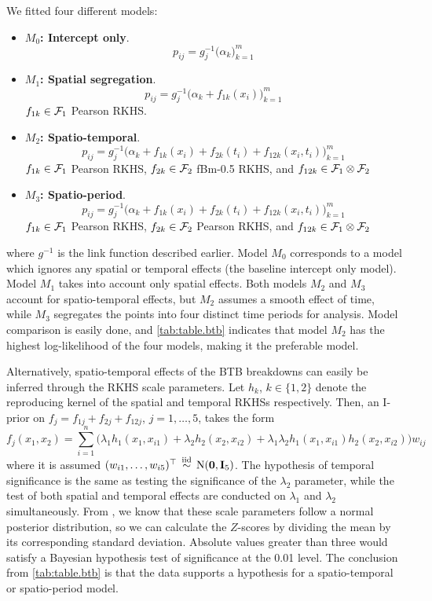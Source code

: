 \documentclass[a4paper,showframe,11pt]{report}\usepackage[]{graphicx}\usepackage[]{color}
\begin{document}
We fitted four different models:
\begin{itemize}
  \item \textbf{\boldmath$M_0$: Intercept only}.
  \[
    p_{ij} = g^{-1}_j\big( \alpha_k \big)_{k=1}^m
  \]
  \item \textbf{\boldmath$M_1$: Spatial segregation}.
  \[
    p_{ij} = g^{-1}_j\big(\alpha_k + f_{1k}(x_i) \big)_{k=1}^m
  \]
  $f_{1k} \in {\mathcal F}_1$ Pearson RKHS.
  \item \textbf{\boldmath$M_2$: Spatio-temporal}.
  \[
    p_{ij} = g^{-1}_j\big(\alpha_k + f_{1k}(x_i) + f_{2k}(t_i) + f_{12k}(x_i,t_i) \big)_{k=1}^m
  \]
  $f_{1k} \in {\mathcal F}_1$ Pearson RKHS, $f_{2k} \in {\mathcal F}_2$ fBm-0.5 RKHS, and $f_{12k} \in {\mathcal F}_1\otimes{\mathcal F}_2$
  \item \textbf{\boldmath$M_3$: Spatio-period}.
  \[
    p_{ij} = g^{-1}_j\big(\alpha_k + f_{1k}(x_i) + f_{2k}(t_i) + f_{12k}(x_i,t_i) \big)_{k=1}^m
  \]
  $f_{1k} \in {\mathcal F}_1$ Pearson RKHS, $f_{2k} \in {\mathcal F}_2$ Pearson RKHS, and $f_{12k} \in {\mathcal F}_1\otimes{\mathcal F}_2$
\end{itemize}
where $g^{-1}$ is the link function described earlier.
Model $M_0$ corresponds to a model which ignores any spatial or temporal effects (the baseline intercept only model).
Model $M_1$ takes into account only spatial effects.
Both models $M_2$ and $M_3$ account for spatio-temporal effects, but $M_2$ assumes a smooth effect of time, while $M_3$ segregates the points into four distinct time periods for analysis.
Model comparison is easily done, and \cref{tab:table.btb} indicates that model $M_2$ has the highest log-likelihood of the four models, making it the preferable model.

Alternatively, spatio-temporal effects of the BTB breakdowns can easily be inferred through the RKHS scale parameters.
Let $h_k$, $k \in \{1,2\}$ denote the reproducing kernel of the spatial and temporal RKHSs respectively.
Then, an I-prior on $f_j = f_{1j} + f_{2j} + f_{12j}$, $j=1,\dots,5$, takes the form
\[
  f_j(x_1,x_2) = \sum_{i=1}^n \big(
  \lambda_1 h_1(x_1, x_{i1}) + \lambda_2 h_2(x_2, x_{i2}) +
  \lambda_1\lambda_2 h_1(x_1, x_{i1}) h_2(x_2, x_{i2})
  \big)w_{ij}
\]
where it is assumed $(w_{i1},\dots,w_{i5})^\top \,\overset{\text{iid}}{\sim}\, \operatorname{N}({\mathbf 0},{\mathbf I}_5)$.
The hypothesis of temporal significance is the same as testing the significance of the $\lambda_2$ parameter, while the test of both spatial and temporal effects are conducted on $\lambda_1$ and $\lambda_2$ simultaneously.
From , we know that these scale parameters follow a normal posterior distribution, so we can calculate the $Z$-scores by dividing the mean by its corresponding standard deviation.
Absolute values greater than three would satisfy a Bayesian hypothesis test of significance at the 0.01 level.
The conclusion from \cref{tab:table.btb} is that the data supports a hypothesis for a spatio-temporal or spatio-period model.
\end{document}

